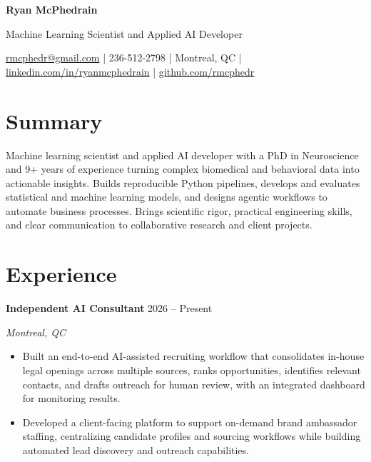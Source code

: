 \documentclass[letterpaper,10pt]{article}
\newcommand{\role}[3]{\textbf{#1} \hfill #3\par\textit{#2}\par}
\begin{document}
\begin{center}
{\LARGE\textbf{Ryan McPhedrain}}\par\vspace{4pt}
{\normalsize Machine Learning Scientist and Applied AI Developer}\par\vspace{3pt}
\small
\href{mailto:rmcphedr@gmail.com}{rmcphedr@gmail.com} | 236-512-2798 | Montreal, QC | \href{https://linkedin.com/in/ryanmcphedrain}{linkedin.com/in/ryanmcphedrain} | \href{https://github.com/rmcphedr}{github.com/rmcphedr}
\end{center}

\section{Summary}
Machine learning scientist and applied AI developer with a PhD in Neuroscience and 9+ years of experience turning complex biomedical and behavioral data into actionable insights. Builds reproducible Python pipelines, develops and evaluates statistical and machine learning models, and designs agentic workflows to automate business processes. Brings scientific rigor, practical engineering skills, and clear communication to collaborative research and client projects.

\section{Experience}
\role{Independent AI Consultant}{Montreal, QC}{2026 -- Present}
\begin{itemize}
    \item Built an end-to-end AI-assisted recruiting workflow that consolidates in-house legal openings across multiple sources, ranks opportunities, identifies relevant contacts, and drafts outreach for human review, with an integrated dashboard for monitoring results.
    \item Developed a client-facing platform to support on-demand brand ambassador staffing, centralizing candidate profiles and sourcing workflows while building automated lead discovery and outreach capabilities.
\end{itemize}
\vspace{3pt}
\end{document}
